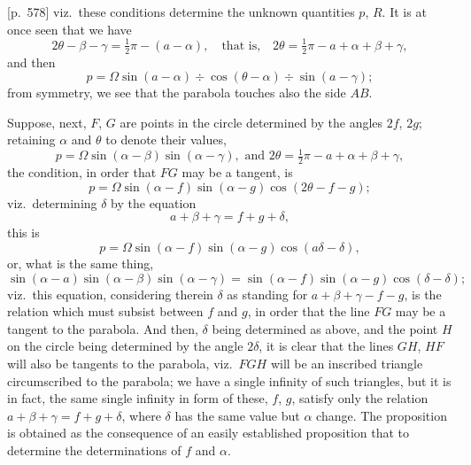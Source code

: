 \documentclass[11pt,a4paper]{article}
\theoremstyle{plain}
\theoremstyle{definition}
\theoremstyle{remark}
\begin{document}
\bigskip

[p.~578] viz.\ these conditions determine the unknown quantities $p$, $R$. It is at once seen that we have
\[
2\theta - \beta - \gamma = \tfrac{1}{2}\pi - (a - \alpha), \quad \text{that is,}\quad 2\theta = \tfrac{1}{2}\pi - a + \alpha + \beta + \gamma,
\]
and then
\[
p = \Omega \sin (a - \alpha) \div \cos(\theta - \alpha) \div \sin(a - \gamma);
\]
from symmetry, we see that the parabola touches also the side $AB$.

Suppose, next, $F$, $G$ are points in the circle determined by the angles $2f$, $2g$; retaining $\alpha$ and $\theta$ to denote their values,
\[
p = \Omega \sin (\alpha - \beta) \sin (\alpha - \gamma), \text{ and } 2\theta = \tfrac{1}{2}\pi - a + \alpha + \beta + \gamma,
\]
the condition, in order that $FG$ may be a tangent, is
\[
p = \Omega \sin (\alpha - f) \sin (\alpha - g) \cos (2\theta - f - g);
\]
viz.\ determining $\delta$ by the equation
\[
a + \beta + \gamma = f + g + \delta,
\]
this is
\[
p = \Omega \sin (\alpha - f) \sin (\alpha - g) \cos (a\delta - \delta),
\]
or, what is the same thing,
\[
\sin (\alpha - a) \sin (\alpha - \beta) \sin (\alpha - \gamma) = \sin (\alpha - f) \sin (\alpha - g) \cos (\delta - \delta);
\]
viz.\ this equation, considering therein $\delta$ as standing for $a + \beta + \gamma - f - g$, is the relation which must subsist between $f$ and $g$, in order that the line $FG$ may be a tangent to the parabola. And then, $\delta$ being determined as above, and the point $H$ on the circle being determined by the angle $2\delta$, it is clear that the lines $GH$, $HF$ will also be tangents to the parabola, viz.\ $FGH$ will be an inscribed triangle circumscribed to the parabola; we have a single infinity of such triangles, but it is in fact, the same single infinity in form of these, $f$, $g$, satisfy only the relation $a + \beta + \gamma = f + g + \delta$, where $\delta$ has the same value but $\alpha$ change. The proposition is obtained as the consequence of an easily established proposition that to determine the determinations of $f$ and $\alpha$.

\bigskip
\end{document}
